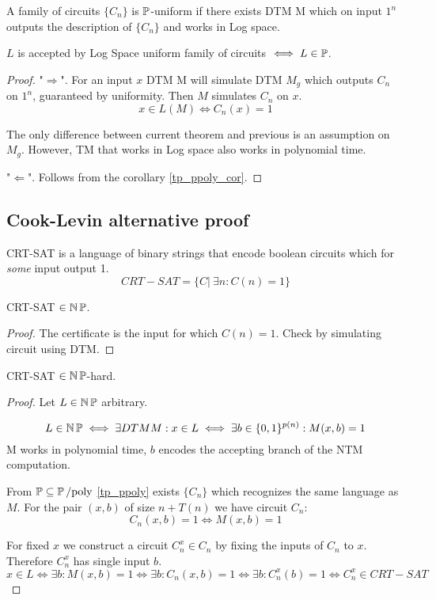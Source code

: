 \begin{definition}
	A family of circuits $\{C_n\}$ is $\operatorname{\mathbb{P}}$-uniform if there exists DTM M which on input $1^n$ outputs the description of $\{C_n\}$ and works in Log space.
\end{definition}

\begin{theorem}
	$L$ is accepted by Log Space uniform family of circuits $\iff L \in \operatorname{\mathbb{P}}$.
\end{theorem}
\begin{proof}
	"$\Rightarrow$". For an input $x$ DTM M will simulate DTM $M_g$ which outputs $C_n$ on $1^n$, guaranteed by uniformity.
	Then $M$ simulates $C_n$ on $x$.
	\[ x \in L(M) \iff C_n(x) = 1 \]

	The only difference between current theorem and previous is an assumption on $M_g$.
	However, TM that works in Log space also works in polynomial time.

	"$\Leftarrow$". Follows from the corollary \cref{tp_ppoly_cor}.
\end{proof}

\subsection{Cook-Levin alternative proof}

\begin{definition}
	CRT-SAT is a language of binary strings that encode boolean circuits which for \emph{some} input output 1.
	\[ CRT-SAT = \{ C |\ \exists n: C(n) = 1 \} \]
\end{definition}

\begin{lemma}
	CRT-SAT $\in \operatorname{\operatorname{\mathbb{N}}\mathbb{P}}$.
\end{lemma}
\begin{proof}
	The certificate is the input for which $C(n) = 1$.
	Check by simulating circuit using DTM.
\end{proof}

\begin{lemma}
	CRT-SAT $\in \operatorname{\operatorname{\mathbb{N}}\mathbb{P}}$-hard.
\end{lemma}
\begin{proof}
	Let $L \in \operatorname{\operatorname{\mathbb{N}}\mathbb{P}}$ arbitrary.

	\[ L \in \operatorname{\operatorname{\mathbb{N}}\mathbb{P}} \iff \exists DTM M: x \in L \iff \exists b \in \{ 0, 1 \}^{p(n)}: M(x, b) = 1 \]
	M works in polynomial time, $b$ encodes the accepting branch of the NTM computation.

	From $\operatorname{\mathbb{P}} \subseteq \operatorname{\operatorname{\mathbb{P}}/poly}$ \cref{tp_ppoly} exists $\{ C_n \}$ which recognizes the same language as $M$.
	For the pair $(x, b)$ of size $n + T(n)$ we have circuit $C_n$:
	\[ C_n(x, b) = 1 \iff M(x, b) = 1 \]

	For fixed $x$ we construct a circuit $C_n^x \in C_n$ by fixing the inputs of $C_n$ to $x$.
	Therefore $C_n^x$ has single input $b$.
	\[ x \in L \iff \exists b: M(x, b) = 1 \iff \exists b: C_n(x, b) = 1 \iff \exists b: C_n^x(b) = 1 \iff C_n^x \in CRT-SAT \]
\end{proof}

